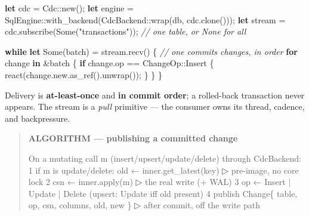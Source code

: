 \documentclass[
  11pt,
  openany]{book}
\newenvironment{Shaded}{}{}
\newcommand{\CommentTok}[1]{\textcolor[rgb]{0.38,0.63,0.69}{\textit{#1}}}
\newcommand{\ConstantTok}[1]{\textcolor[rgb]{0.53,0.00,0.00}{#1}}
\newcommand{\ControlFlowTok}[1]{\textcolor[rgb]{0.00,0.44,0.13}{\textbf{#1}}}
\newcommand{\KeywordTok}[1]{\textcolor[rgb]{0.00,0.44,0.13}{\textbf{#1}}}
\newcommand{\NormalTok}[1]{#1}
\newcommand{\OperatorTok}[1]{\textcolor[rgb]{0.40,0.40,0.40}{#1}}
\newcommand{\PreprocessorTok}[1]{\textcolor[rgb]{0.74,0.48,0.00}{#1}}
\newcommand{\StringTok}[1]{\textcolor[rgb]{0.25,0.44,0.63}{#1}}
\begin{document}
\begin{Shaded}
\begin{Highlighting}[]
\KeywordTok{let}\NormalTok{ cdc }\OperatorTok{=} \PreprocessorTok{Cdc::}\NormalTok{new()}\OperatorTok{;}
\KeywordTok{let}\NormalTok{ engine }\OperatorTok{=} \PreprocessorTok{SqlEngine::}\NormalTok{with\_backend(}\PreprocessorTok{CdcBackend::}\NormalTok{wrap(db}\OperatorTok{,}\NormalTok{ cdc}\OperatorTok{.}\NormalTok{clone()))}\OperatorTok{;}
\KeywordTok{let}\NormalTok{ stream }\OperatorTok{=}\NormalTok{ cdc}\OperatorTok{.}\NormalTok{subscribe(}\ConstantTok{Some}\NormalTok{(}\StringTok{"transactions"}\NormalTok{))}\OperatorTok{;}   \CommentTok{// one table, or None for all}

\ControlFlowTok{while} \KeywordTok{let} \ConstantTok{Some}\NormalTok{(batch) }\OperatorTok{=}\NormalTok{ stream}\OperatorTok{.}\NormalTok{recv() }\OperatorTok{\{}              \CommentTok{// one commit\textquotesingle{}s changes, in order}
    \ControlFlowTok{for}\NormalTok{ change }\KeywordTok{in} \OperatorTok{\&}\NormalTok{batch }\OperatorTok{\{}
        \ControlFlowTok{if}\NormalTok{ change}\OperatorTok{.}\NormalTok{op }\OperatorTok{==} \PreprocessorTok{ChangeOp::}\NormalTok{Insert }\OperatorTok{\{}
\NormalTok{            react(change}\OperatorTok{.}\NormalTok{new}\OperatorTok{.}\NormalTok{as\_ref()}\OperatorTok{.}\NormalTok{unwrap())}\OperatorTok{;}
        \OperatorTok{\}}
    \OperatorTok{\}}
\OperatorTok{\}}
\end{Highlighting}
\end{Shaded}

Delivery is \textbf{at-least-once} and \textbf{in commit order}; a
rolled-back transaction never appears. The stream is a \emph{pull}
primitive --- the consumer owns its thread, cadence, and backpressure.

\begin{quote}
\textbf{ALGORITHM --- publishing a committed change}

\begin{Shaded}
\begin{Highlighting}[]
\NormalTok{On a mutating call m (insert/upsert/update/delete) through CdcBackend:}
\NormalTok{1  if m is update/delete: old ← inner.get\_latest(key)      ▷ pre{-}image, no core lock}
\NormalTok{2  csn ← inner.apply(m)                                    ▷ the real write (+ WAL)}
\NormalTok{3  op  ← Insert | Update | Delete   (upsert: Update iff old present)}
\NormalTok{4  publish Change\{ table, op, csn, columns, old, new \}     ▷ after commit, off the write path}
\end{Highlighting}
\end{Shaded}
\end{quote}
\end{document}
